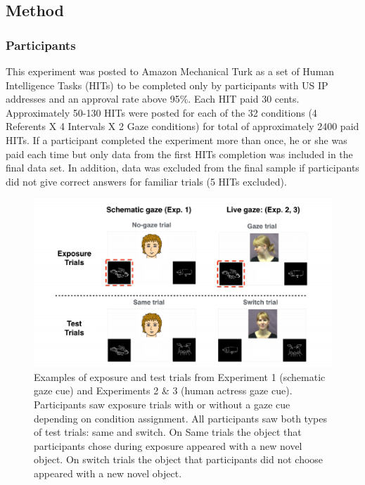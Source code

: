 \documentclass[a4paper,man,natbib]{apa6}
\newenvironment{CodeChunk}{}{}
\begin{document}
\subsection{Method}\label{method}

\subsubsection{Participants}\label{participants}

This experiment was posted to Amazon Mechanical Turk as a set of Human
Intelligence Tasks (HITs) to be completed only by participants with US
IP addresses and an approval rate above 95\%. Each HIT paid 30 cents.
Approximately 50-130 HITs were posted for each of the 32 conditions (4
Referents X 4 Intervals X 2 Gaze conditions) for total of approximately
2400 paid HITs. If a participant completed the experiment more than
once, he or she was paid each time but only data from the first HITs
completion was included in the final data set. In addition, data was
excluded from the final sample if participants did not give correct
answers for familiar trials (5 HITs excluded).

\begin{CodeChunk}
\begin{figure}
\includegraphics{figs/stimuli-1} \caption[Examples of exposure and test trials from Experiment 1 (schematic gaze cue) and Experiments 2 \& 3 (human actress gaze cue)]{Examples of exposure and test trials from Experiment 1 (schematic gaze cue) and Experiments 2 \& 3 (human actress gaze cue). Participants saw exposure trials with or without a gaze cue depending on condition assignment. All participants saw both types of test trials: same and switch. On Same trials the object that participants chose during exposure appeared with a new novel object. On switch trials the object that participants did not choose appeared with a new novel object.}\label{fig:stimuli}
\end{figure}
\end{CodeChunk}
\end{document}

